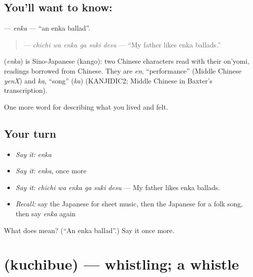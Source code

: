 \subsection*{You'll want to know: }
\textbf{} — \emph{enka} — \textquotedblleft{}an enka ballad\textquotedblright{}.

\begin{quote}
\textbf{  } — \emph{chichi wa enka ga suki desu} — \textquotedblleft{}My father likes enka ballads.\textquotedblright{}
\end{quote}

\begin{cousinweb}
\textbf{} (\emph{enka}) is Sino-Japanese (kango): two Chinese characters read with their on'yomi, readings borrowed from Chinese. They are \emph{en}, \textquotedblleft{}performance\textquotedblright{} (Middle Chinese \emph{yenX}) and \emph{ka}, \textquotedblleft{}song\textquotedblright{} (\emph{ka}) (KANJIDIC2; Middle Chinese in Baxter's transcription).
\end{cousinweb}

\begin{grammarlens}[title={What you've built}]
One more word for describing what you lived and felt.
\end{grammarlens}

\subsection*{Your turn}
\begin{itemize}
\raggedright
  \item \emph{Say it:} \emph{enka}
  \item \emph{Say it:} \emph{enka}, once more
  \item \emph{Say it:} \emph{chichi wa enka ga suki desu} — My father likes enka ballads.
  \item \emph{Recall:} say the Japanese for sheet music, then the Japanese for a folk song, then say \emph{enka} again
\end{itemize}

\begin{tcolorbox}[breakable,colback=teal!4,colframe=teal!35!black,title={Before you move on}]
What does  mean? (\textquotedblleft{}An enka ballad\textquotedblright{}.) Say it once more.
\end{tcolorbox}
\section[\texorpdfstring{\ja{くちぶえ} (kuchibue)}{くちぶえ (kuchibue)}]{ (kuchibue) — whistling; a whistle}

